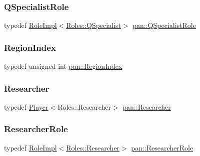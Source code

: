 \mbox{\label{namespacepan_a399797d578fb2a50312818f52b94f8dd}} 
\subsubsection{\texorpdfstring{Q\+Specialist\+Role}{QSpecialistRole}}
{\footnotesize\ttfamily typedef \hyperlink{classpan_1_1_role_impl}{Role\+Impl}$<$\hyperlink{namespacepan_a5017f84fa51152eae453759537d1ced6ae0f77fedb512beb1711d43d21dc3aa47}{Roles\+::\+Q\+Specialist}$>$ \hyperlink{namespacepan_a399797d578fb2a50312818f52b94f8dd}{pan\+::\+Q\+Specialist\+Role}}

\mbox{\label{namespacepan_a648dcc32a76222a9e4cd4a3e80bda642}} 
\subsubsection{\texorpdfstring{Region\+Index}{RegionIndex}}
{\footnotesize\ttfamily typedef unsigned int \hyperlink{namespacepan_a648dcc32a76222a9e4cd4a3e80bda642}{pan\+::\+Region\+Index}}

\mbox{\label{namespacepan_aec10143cf4ec83bfb6fb2700234682fe}} 
\subsubsection{\texorpdfstring{Researcher}{Researcher}}
{\footnotesize\ttfamily typedef \hyperlink{classpan_1_1_player}{Player}$<$Roles\+::\+Researcher$>$ \hyperlink{namespacepan_aec10143cf4ec83bfb6fb2700234682fe}{pan\+::\+Researcher}}

\mbox{\label{namespacepan_a0854d847c20b733c1bf18983cb926d5a}} 
\subsubsection{\texorpdfstring{Researcher\+Role}{ResearcherRole}}
{\footnotesize\ttfamily typedef \hyperlink{classpan_1_1_role_impl}{Role\+Impl}$<$\hyperlink{namespacepan_a5017f84fa51152eae453759537d1ced6ae333508b3f7d851e40075d1eb5a0eae8}{Roles\+::\+Researcher}$>$ \hyperlink{namespacepan_a0854d847c20b733c1bf18983cb926d5a}{pan\+::\+Researcher\+Role}}

